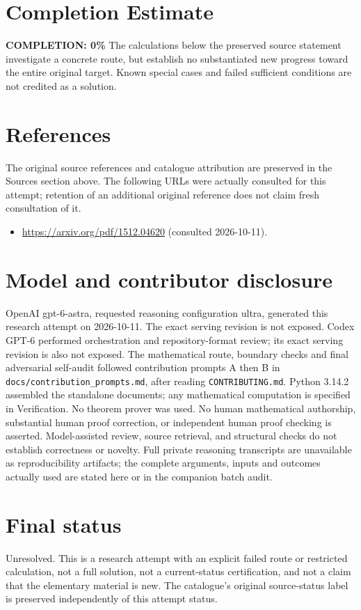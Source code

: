 \documentclass[11pt]{article}
\begin{document}
\section{Completion Estimate}
\noindent\textbf{COMPLETION: 0\%}
The calculations below the preserved source statement investigate a concrete route,
but establish no substantiated new progress toward the entire original target.
Known special cases and failed sufficient conditions are not credited as a solution.
\section{References}
The original source references and catalogue attribution are preserved in the
Sources section above. The following URLs were actually consulted for this attempt;
retention of an additional original reference does not claim fresh consultation of it.
\begin{itemize}
\item \url{https://arxiv.org/pdf/1512.04620} (consulted 2026-10-11). 
\end{itemize}
\section{Model and contributor disclosure}
OpenAI gpt-6-astra, requested reasoning configuration ultra, generated this research
attempt on 2026-10-11. The exact serving revision is not exposed. Codex GPT-6
performed orchestration and repository-format review; its exact serving revision
is also not exposed. The mathematical route, boundary checks and final adversarial
self-audit followed contribution prompts A then B in
\texttt{docs/contribution\_prompts.md}, after reading \texttt{CONTRIBUTING.md}.
Python 3.14.2 assembled the standalone documents; any mathematical computation is
specified in Verification. No theorem prover was used. No human mathematical
authorship, substantial human proof correction, or independent human proof checking
is asserted. Model-assisted review, source retrieval, and structural checks do not
establish correctness or novelty. Full private reasoning transcripts are unavailable
as reproducibility artifacts; the complete arguments, inputs and outcomes actually
used are stated here or in the companion batch audit.
\section{Final status}
Unresolved. This is a research attempt with an explicit failed route or restricted
calculation, not a full solution, not a current-status certification, and not a claim
that the elementary material is new. The catalogue's original source-status label
is preserved independently of this attempt status.
\end{document}
